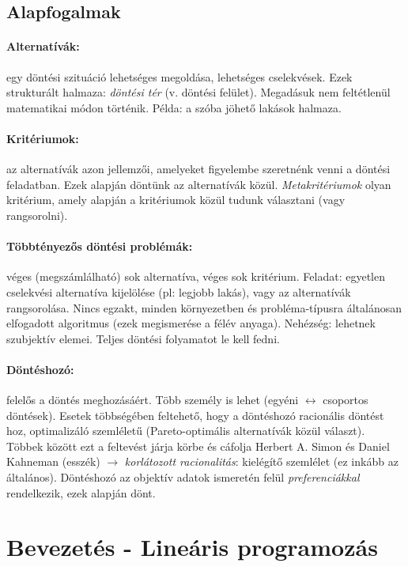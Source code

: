 \documentclass[a4paper,12pt]{article}
\begin{document}
\subsection{Alapfogalmak}

\paragraph{Alternatívák:} egy döntési szituáció lehetséges megoldása, lehetséges cselekvések. Ezek strukturált halmaza: \emph{döntési tér} (v. döntési felület). Megadásuk nem feltétlenül matematikai módon történik. Példa: a szóba jöhető lakások halmaza.

\paragraph{Kritériumok:} az alternatívák azon jellemzői, amelyeket figyelembe szeretnénk venni a döntési feladatban. Ezek alapján döntünk az alternatívák közül. \emph{Metakritériumok} olyan kritérium, amely alapján a kritériumok közül tudunk választani (vagy rangsorolni).

\paragraph{Többtényezős döntési problémák:} véges (megszámlálható) sok alternatíva, véges sok kritérium. Feladat: egyetlen cselekvési alternatíva kijelölése (pl: legjobb lakás), vagy az alternatívák rangsorolása. Nincs egzakt, minden környezetben és probléma-típusra általánosan elfogadott algoritmus (ezek megismerése a félév anyaga). Nehézség: lehetnek szubjektív elemei. Teljes döntési folyamatot le kell fedni.

\paragraph{Döntéshozó:} felelős a döntés meghozásáért. Több személy is lehet (egyéni $\leftrightarrow$ csoportos döntések). Esetek többségében feltehető, hogy a döntéshozó racionális döntést hoz, optimalizáló szemléletű (Pareto-optimális alternatívák közül választ). Többek között ezt a feltevést járja körbe és cáfolja Herbert A. Simon és Daniel Kahneman (esszék) $\rightarrow$ \emph{korlátozott racionalitás}: kielégítő szemlélet (ez inkább az általános). Döntéshozó az objektív adatok ismeretén felül \emph{preferenciákkal} rendelkezik, ezek alapján dönt.

\section{Bevezetés - Lineáris programozás}
\end{document}
